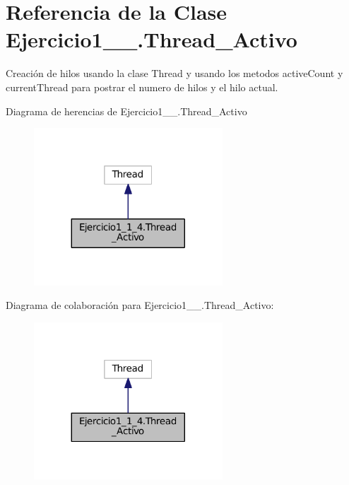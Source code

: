 \hypertarget{class_ejercicio1__1__4_1_1_thread___activo}{}\section{Referencia de la Clase Ejercicio1\+\_\+\_.\+Thread\+\_\+\+Activo}
\label{class_ejercicio1__1__4_1_1_thread___activo}


Creación de hilos usando la clase Thread y usando los metodos active\+Count y current\+Thread para postrar el numero de hilos y el hilo actual.  




Diagrama de herencias de Ejercicio1\+\_\+\_.\+Thread\+\_\+\+Activo
\nopagebreak
\begin{figure}[H]
\begin{center}
\leavevmode
\includegraphics[width=200pt]{class_ejercicio1__1__4_1_1_thread___activo__inherit__graph}
\end{center}
\end{figure}


Diagrama de colaboración para Ejercicio1\+\_\+\_.\+Thread\+\_\+\+Activo\+:
\nopagebreak
\begin{figure}[H]
\begin{center}
\leavevmode
\includegraphics[width=200pt]{class_ejercicio1__1__4_1_1_thread___activo__coll__graph}
\end{center}
\end{figure}
